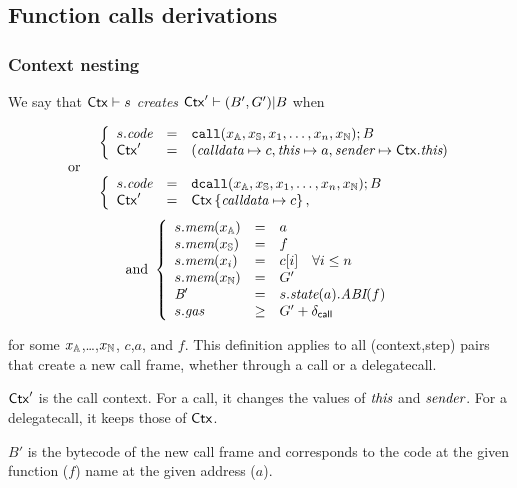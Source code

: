 \subsection{Function calls derivations}

\subsubsection{Context nesting}
We say that \emph{$\mathsf{Ctx}\vdash s$ creates $\mathsf{Ctx}'\vdash(B',G')| B$} when

$$
\begin{array}{ll}
&\left\{
    \begin{array}{lll}
    s.\textit{code} &=&  \mathtt{call}(x_{\mathbb{A}},x_{\mathbb{S}},x_1,\dots,x_n, x_{\mathbb{N}});B \\
    \mathsf{Ctx}' &=&(\textit{calldata}\mapsto c,
     \textit{this}\mapsto a,
     \textit{sender}\mapsto\mathsf{Ctx}.\textit{this})
    \end{array}\right.\\
\hbox{ or }&\\
&\left\{
    \begin{array}{lll}
    s.\textit{code} &=& \mathtt{dcall}(x_{\mathbb{A}},x_{\mathbb{S}},x_1,\dots,x_n, x_{\mathbb{N}});B \\
    \mathsf{Ctx}'&=&\mathsf{Ctx}\left\{\textit{calldata}\mapsto c\right\},
    \end{array}
    \right.
\end{array}
$$
$$
\begin{array}{cc}
\hbox{and }
\left\{
    \begin{array}{lll}
    s.\textit{mem}(x_{\mathbb{A}}) & = & a \\
    s.\textit{mem}(x_{\mathbb{S}}) & = & f \\
    s.\textit{mem}(x_i) & = & c[i]\quad \forall i\leq n \\
    s.\textit{mem}(x_{\mathbb{N}}) & = & G' \\
    \textit{B}{}' &=& s.\textit{state}(a).\textit{ABI}(f)\\
    s.\textit{gas} &\geq& G' + \delta_{\mathsf{call}}
    \end{array}\right.
\end{array}
$$

for some $x_{\mathbb{A}}$,\dots,$x_{\mathbb{N}}$, $c$,$a$, and $f$. This definition applies to all (context,step) pairs that create a new call frame, whether through a call or a delegatecall. 

$\mathsf{Ctx}'$ is the call context. For a call, it changes the values of $\textit{this}$ and $\textit{sender}$. For a delegatecall, it keeps those of $\mathsf{Ctx}$. 

$B'$ is the bytecode of the new call frame and corresponds to the code at the given function ($f$) name at the given address ($a$). 

